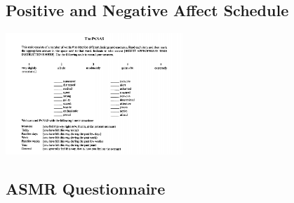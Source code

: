 \documentclass{sigchi}
\begin{document}
\subsection{Positive and Negative Affect Schedule}
\includegraphics[width=0.5\textwidth]{questionnaires/ThePANAS.png}

\subsection{ASMR Questionnaire}

\end{document}
